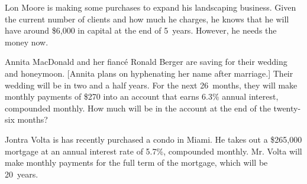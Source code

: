 \documentclass[12pt,letterpaper]{exam}
\begin{document}
\begin{questions}



\newpage
\question  Lon Moore is making some purchases to expand his landscaping business. Given the current number of clients and how much he charges, he knows that he will have around \$6,000 in capital at the end of 5~years. However, he needs the money now. \pspace




\newpage
\question[10] Annita MacDonald and her fianc\'e Ronald Berger are saving for their wedding and honeymoon. [Annita plans on hyphenating her name after marriage.] Their wedding will be in two and a half years. For the next 26~months, they will make monthly payments of \$270 into an account that earns 6.3\% annual interest, compounded monthly. How much will be in the account at the end of the twenty-six months? 



\newpage
\question Jontra Volta is has recently purchased a condo in Miami. He takes out a \$265,000 mortgage at an annual interest rate of 5.7\%, compounded monthly. Mr. Volta will make monthly payments for the full term of the mortgage, which will be 20~years. \pspace
	

\end{questions}
\end{document}
